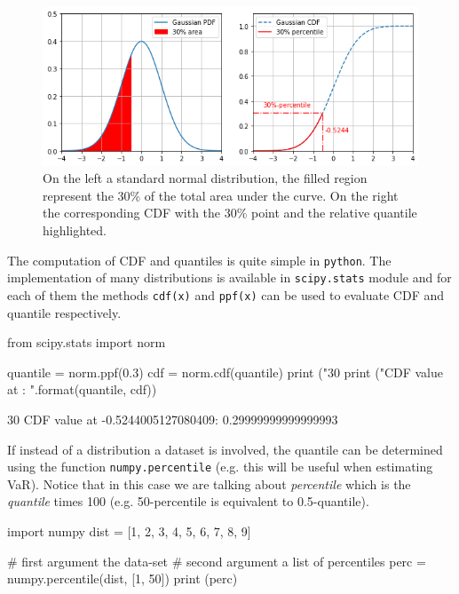 \begin{figure}[htb]
	\centering
	\includegraphics[width=1.\textwidth]{figures/percentile.png}
	\caption{On the left a standard normal distribution, the filled region represent the 30\% of the total area under the curve. On the right the corresponding CDF with the 30\% point and the relative quantile highlighted.}
	\label{fig:percentile}
\end{figure}

The computation of CDF and quantiles is quite simple in \texttt{python}. The implementation of many distributions is available in \texttt{scipy.stats} module and for each of them the methods \texttt{cdf(x)} and \texttt{ppf(x)} can be used to evaluate CDF and quantile respectively.

\begin{ipython}
from scipy.stats import norm

quantile = norm.ppf(0.3)
cdf = norm.cdf(quantile)
print ("30%
print ("CDF value at {}: {}".format(quantile, cdf))
\end{ipython}
\begin{ioutput}
30%
CDF value at -0.5244005127080409: 0.29999999999999993
\end{ioutput}

If instead of a distribution a dataset is involved, the quantile can be determined using the function \texttt{numpy.percentile} (e.g. this will be useful when estimating VaR). Notice that in this case we are talking about \emph{percentile} which is the \emph{quantile} times 100 (e.g. 50-percentile is equivalent to 0.5-quantile).

\begin{ipython}
import numpy
dist = [1, 2, 3, 4, 5, 6, 7, 8, 9]

# first argument the data-set
# second argument a list of percentiles
perc = numpy.percentile(dist, [1, 50])
print (perc)
\end{ipython}
\begin{ioutput}
[1.08 5.  ]
\end{ioutput}

